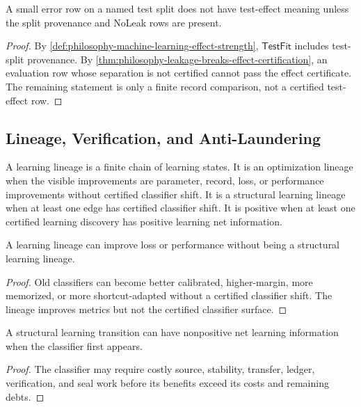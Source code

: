 \begin{corollary}
\label{cor:philosophy-test-fit-requires-split-provenance}
A small error row on a named test split does not have test-effect
meaning unless the split provenance and NoLeak rows are present.
\end{corollary}
\begin{proof}
By \autoref{def:philosophy-machine-learning-effect-strength},
$\mathsf{TestFit}$ includes test-split provenance. By
\autoref{thm:philosophy-leakage-breaks-effect-certification}, an
evaluation row whose separation is not certified cannot pass the effect
certificate. The remaining statement is only a finite record comparison,
not a certified test-effect row.
\end{proof}

\subsection{Lineage, Verification, and Anti-Laundering}
\label{subsec:philosophy-learning-lineage-verification-anti-laundering}

\begin{definition}
\label{def:philosophy-learning-lineage}
A learning lineage is a finite chain of learning states. It is an
optimization lineage when the visible improvements are parameter, record,
loss, or performance improvements without certified classifier shift. It
is a structural learning lineage when at least one edge has certified
classifier shift. It is positive when at least one certified learning
discovery has positive learning net information.
\end{definition}

\begin{theorem}
\label{thm:philosophy-learning-optimization-not-structural}
A learning lineage can improve loss or performance without being a
structural learning lineage.
\end{theorem}
\begin{proof}
Old classifiers can become better calibrated, higher-margin, more
memorized, or more shortcut-adapted without a certified classifier shift.
The lineage improves metrics but not the certified classifier surface.
\end{proof}

\begin{theorem}
\label{thm:philosophy-structural-learning-not-immediately-positive}
A structural learning transition can have nonpositive net learning
information when the classifier first appears.
\end{theorem}
\begin{proof}
The classifier may require costly source, stability, transfer, ledger,
verification, and seal work before its benefits exceed its costs and
remaining debts.
\end{proof}

